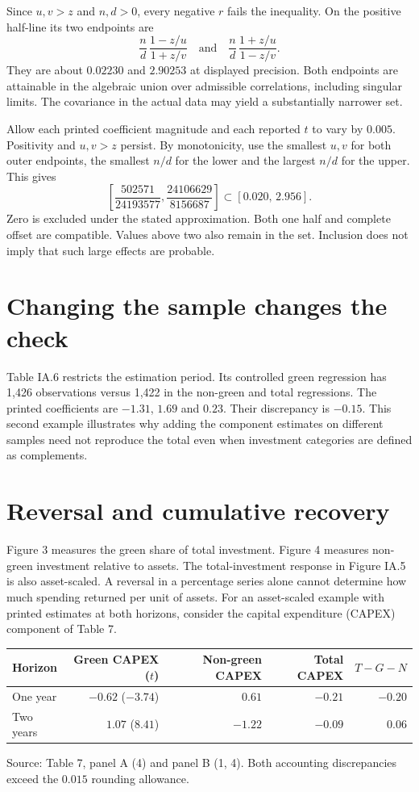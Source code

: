 \documentclass[11pt]{article}
\begin{document}
Since $u,v>z$ and $n,d>0$, every negative $r$ fails the inequality. On the positive half-line its two endpoints are
\[
 \frac nd\,\frac{1-z/u}{1+z/v}
 \quad\text{and}\quad
 \frac nd\,\frac{1+z/u}{1-z/v}.
\]
They are about $0.02230$ and $2.90253$ at displayed precision. Both endpoints are attainable in the algebraic union over admissible correlations, including singular limits. The covariance in the actual data may yield a substantially narrower set.

Allow each printed coefficient magnitude and each reported $t$ to vary by $0.005$. Positivity and $u,v>z$ persist. By monotonicity, use the smallest $u,v$ for both outer endpoints, the smallest $n/d$ for the lower and the largest $n/d$ for the upper. This gives
\[
 \left[\frac{502571}{24193577},\frac{24106629}{8156687}\right]
 \subset [0.020,\,2.956].
\]
Zero is excluded under the stated approximation. Both one half and complete offset are compatible. Values above two also remain in the set. Inclusion does not imply that such large effects are probable.

\section{Changing the sample changes the check}
Table IA.6 restricts the estimation period. Its controlled green regression has 1,426 observations versus 1,422 in the non-green and total regressions. The printed coefficients are $-1.31$, $1.69$ and $0.23$. Their discrepancy is $-0.15$. This second example illustrates why adding the component estimates on different samples need not reproduce the total even when investment categories are defined as complements.

\clearpage
\section{Reversal and cumulative recovery}
Figure 3 measures the green share of total investment. Figure 4 measures non-green investment relative to assets. The total-investment response in Figure IA.5 is also asset-scaled. A reversal in a percentage series alone cannot determine how much spending returned per unit of assets. For an asset-scaled example with printed estimates at both horizons, consider the capital expenditure (CAPEX) component of Table 7.

\begin{center}
\begin{tabular}{lrrrr}
\toprule
Horizon & Green CAPEX ($t$) & Non-green CAPEX & Total CAPEX & $T-G-N$\\
\midrule
One year & $-0.62$ ($-3.74$) & $0.61$ & $-0.21$ & $-0.20$\\
Two years & $1.07$ ($8.41$) & $-1.22$ & $-0.09$ & $0.06$\\
\bottomrule
\end{tabular}
\end{center}
\noindent Source: Table 7, panel A (4) and panel B (1, 4). Both accounting discrepancies exceed the $0.015$ rounding allowance.
\end{document}

